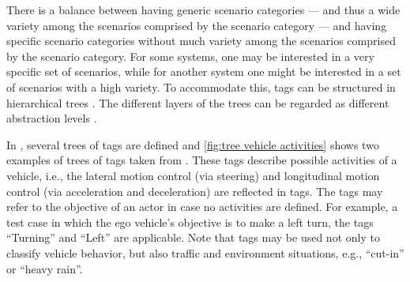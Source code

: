 There is a balance between having generic scenario categories --- and thus a wide variety among the scenarios comprised by the scenario category --- and having specific scenario categories without much variety among the scenarios comprised by the scenario category. For some systems, one may be interested in a very specific set of scenarios, while for another system one might be interested in a set of scenarios with a high variety. To accommodate this, tags can be structured in hierarchical trees \autocite{molloy2017dynamic}. The different layers of the trees can be regarded as different abstraction levels \autocite{Bonnin2014}. 

In \autocite{degelder2019scenariocategories}, several trees of tags are defined and \cref{fig:tree vehicle activities} shows two examples of trees of tags taken from \autocite{degelder2019scenariocategories}. These tags describe possible activities of a vehicle, i.e., the lateral motion control (via steering) and longitudinal motion control (via acceleration and deceleration) are reflected in tags. The tags may refer to the objective of an actor in case no activities are defined. For example, a test case in which the ego vehicle's objective is to make a left turn, the tags ``Turning'' and ``Left'' are applicable. Note that tags may be used not only to classify vehicle behavior, but also traffic and environment situations, e.g., ``cut-in'' or ``heavy rain''.

 
